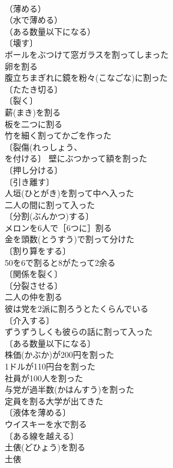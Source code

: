 \documentclass[8pt]{extreport}
\begin{document}
\begin{CJK}{UTF8}{min}
\\	（薄める）
\\	（水で薄める）
\\	（ある数量以下になる）
\\	〔壊す〕
\\	ボールをぶつけて窓ガラスを割ってしまった 
\\	卵を割る 
\\	腹立ちまぎれに鏡を粉々(こなごな)に割った 
\\	〔たたき切る〕
\\	〔裂く〕
\\	薪(まき)を割る 
\\	板を二つに割る 
\\	竹を細く割ってかごを作った 
\\	〔裂傷(れっしょう、
\\	を付ける〕 壁にぶつかって額を割った 
\\	〔押し分ける〕
\\	〔引き離す〕
\\	人垣(ひとがき)を割って中へ入った 
\\	二人の間に割って入った 
\\	〔分割(ぶんかつ)する〕
\\	メロンを6人で［6つに］割る 
\\	金を頭数(とうすう)で割って分けた 
\\	〔割り算をする〕
\\	50を6で割ると8がたって2余る 
\\	〔関係を裂く〕
\\	〔分裂させる〕
\\	二人の仲を割る 
\\	彼は党を2派に割ろうとたくらんでいる 
\\	〔介入する〕
\\	ずうずうしくも彼らの話に割って入った 
\\	〔ある数量以下になる〕
\\	株価(かぶか)が200円を割った 
\\	1ドルが110円台を割った 
\\	社員が100人を割った 
\\	与党が過半数(かはんすう)を割った 
\\	定員を割る大学が出てきた 
\\	〔液体を薄める〕
\\	ウイスキーを水で割る 
\\	〔ある線を越える〕
\\	土俵(どひょう)を割る 
\\	土俵　

\end{CJK}
\end{document}

